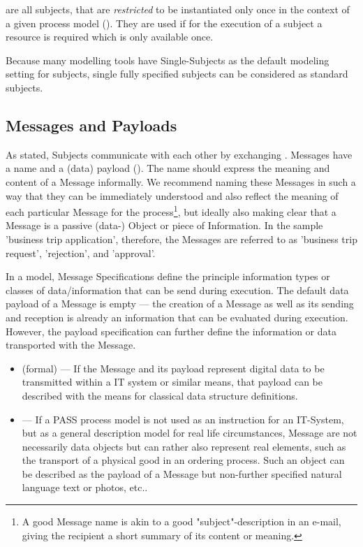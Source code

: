  are all subjects, that are \textit{restricted} to be instantiated  only once in the context of a given process model (). They are used if for the execution of a subject a resource is required which is only available once.

Because many modelling tools have Single-Subjects as the default modeling setting for subjects, single fully specified subjects can be considered as standard subjects.


\subsection{Messages and Payloads}
\label{sec:MessagePayload}

As stated, Subjects communicate with each other by exchanging . Messages have a name and a (data) payload (). The name should express the meaning and content of a Message informally. We recommend naming these Messages in such a way that they can be immediately understood and also reflect the meaning of each particular Message for the process\footnote{A good Message name is akin to a good "subject"-description in an e-mail, giving the recipient a short summary of its content or meaning.}, but ideally also making clear that a Message is a passive (data-) Object or piece of Information. In the sample 'business trip application', therefore, the Messages are referred to as 'business trip request', 'rejection', and 'approval'.

In a model, Message Specifications define the principle information types or classes of data/information that can be send during execution. The default data payload of a Message is empty --- the creation of a Message as well as its sending and reception is already an information that can be evaluated during execution. However, the payload specification can further define the information or data transported with the Message. 

\begin{itemize}
    \item (formal)  --- If the Message and its payload represent digital data to be transmitted within a IT system or similar means, that payload can be described with the means for classical data structure definitions. 
    \item {} --- If a PASS process model is not used as an instruction for an IT-System, but as a general description model for real life circumstances, Message are not necessarily data objects but can rather also represent real elements, such as the transport of a physical good in an ordering process. Such an object can be described as the payload of a Message but non-further specified natural language text or photos, etc..
\end{itemize}

